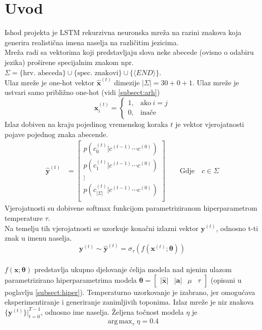\documentclass[conference]{IEEEtran}
\DeclareMathOperator*{\argmax}{arg\,max}
\begin{document}
\section{Uvod}
\label{sect:intro}
Ishod projekta je LSTM rekurzivna neuronska mreža na razini znakova koja generira realistična imena naselja na različitim jezicima.\\
Mreža radi sa vektorima koji predstavljaju slova neke abecede (ovisno o odabiru jezika) proširene specijalnim znakom npr. $\Sigma = \{ \text{hrv. abeceda}\} \cup \{ \text{spec. znakovi}\} \cup \{\langle END \rangle\}$.\\
Ulaz mreže je one-hot vektor $\mathbf{\hat{x}}^{(t)}$ dimezije $\lvert \Sigma \rvert = 30 + 0 + 1$.
Ulaz mreže je ustvari samo približno one-hot (vidi \ref{subsect:arh})
\begin{equation}
\mathbf{x}^{(t)}_i=
    \begin{cases}
      1, & \text{ako}\ i=j \\
      0, & \text{inače}
    \end{cases}
\end{equation}
Izlaz dobiven na kraju pojedinog vremenskog koraka $t$ je vektor vjerojatnosti pojave pojednog znaka abecende.\\
\begin{align}
    \hat{\mathbf{y}}^{(t)} &= \begin{bmatrix}
           p(c_0^{(t)} | c^{(t-1)} \cdots c^{(0)} ) \\
           p(c_1^{(t)} | c^{(t-1)} \cdots c^{(0)} ) \\
           \vdots \\
           p(c_{\lvert \Sigma \rvert}^{(t)} | c^{(t-1)} \cdots c^{(0)} ) \\
         \end{bmatrix}
         \quad \quad \text{Gdje} \quad c \in \Sigma
\end{align}
Vjerojatnosti su dobivene softmax funkcijom parametriziranom hiperparametrom temperature $\tau$.\\
Na temelju tih vjerojatnosti se uzorkuje konačni izlazni vektor $\mathbf{y}^{(t)}$, odnosno t-ti znak u imenu naselja.\\
\begin{equation}
 \mathbf{y}^{(t)} \sim \hat{\mathbf{y}}^{(t)} = \sigma_{\tau}(f(\mathbf{x}^{(t)} ; \boldsymbol{\theta}))
\end{equation}
\ \\
$f(\mathbf{x} ; \boldsymbol{\theta})$ predstavlja ukupno djelovanje ćelija modela nad njenim ulazom parametrizirano hiperparametrima modela $\boldsymbol{\theta} = \begin{bmatrix} \lvert \mathbf{\hat{x}} \rvert & \lvert \mathbf{a} \rvert & \mu & \tau \end{bmatrix}$ (opisani u poglavlju \ref{subsect:hiper}).
Temperaturno uzorkovanje je izabrano, jer omogućava eksperimentiranje i generiranje zanimljivih toponima.
Izlaz mreže je niz znakova $\{\mathbf{y}^{(t)}\} \biggr \rvert_{t=0}^{T-1}$, odnosno ime naselja.
Željena točnost modela $\eta$ je \[\argmax_{\tau} \eta = 0.4\]
\end{document}
